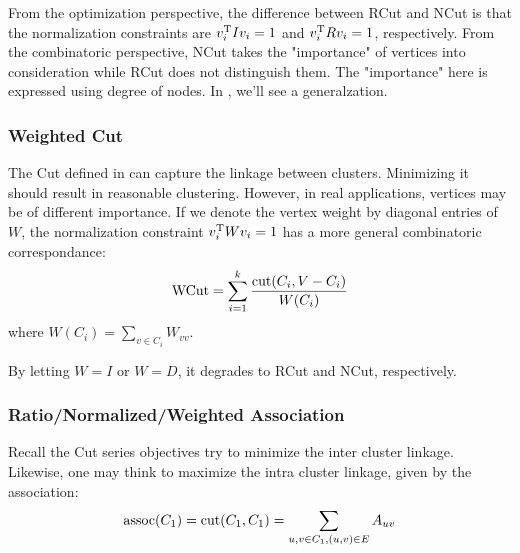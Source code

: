 From the optimization perspective, 
the difference between RCut and NCut is that the normalization 
constraints are $ v_i^\mathrm{T}Iv_i = 1 $ and $ v_i^\mathrm{T}Rv_i = 1 $, 
respectively. From the combinatoric perspective, NCut takes the 
"importance" of vertices into consideration while RCut does
not distinguish them. The "importance" here is expressed using 
degree of nodes. In \rsec{\ref{sec:wcut}}, we'll see a generalzation.  

\subsubsection{Weighted Cut}
\label{sec:wcut}

The Cut defined in \req{\ref{eq:cut_def}} can capture the linkage 
between clusters. Minimizing it should result in reasonable clustering. 
However, in real applications, vertices may be of different 
importance. If we denote the vertex weight by diagonal entries of $ W $, 
the normalization constraint $ v_i^\mathrm{T}Wv_i = 1 $ has a more general 
combinatoric correspondance:
\begin{equation}
	\text{WCut} = \sum_{i=1}^{k}{ \frac{\text{cut}(C_i, V-C_i)}{W(C_i)} } 
\end{equation}
where $ W(C_i) = \sum_{v \in C_i}{W_{vv}} $. 

By letting $ W=I $ or $ W=D $, it degrades to RCut and NCut, respectively. 

\subsubsection{Ratio/Normalized/Weighted Association}
\label{sec:nassoc}

Recall the Cut series objectives try to minimize the 
inter cluster linkage. Likewise, one may think to maximize 
the intra cluster linkage, given by
the association: %
\begin{equation}
	\text{assoc}(C_1) = \text{cut}(C_1, C_1) =  \sum_{u,v \in C_1, (u,v) \in E}{A_{uv}}
\end{equation}

